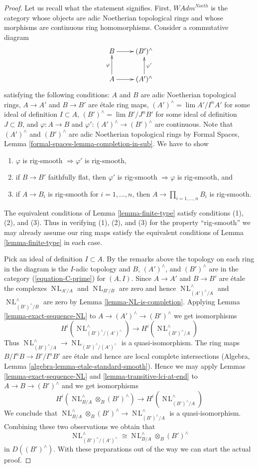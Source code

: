\documentclass[10pt,a4paper]{amsart}
\theoremstyle{plain}
\theoremstyle{definition}
\theoremstyle{remark}
\numberwithin{equation}{subsection}
\def\lim{\mathop{\mathrm{lim}}\nolimits}
\def\NL{\mathop{N\!L}\nolimits}
\begin{document}
\begin{proof}
Let us recall what the statement signifies. First, 
$\textit{WAdm}^{Noeth}$ is the category whose objects are
adic Noetherian topological rings and whose morphisms are
continuous ring homomorphisms. Consider a commutative diagram
$$
\xymatrix{
B \ar[r] & (B')^\wedge \\
A \ar[r] \ar[u]^\varphi & (A')^\wedge \ar[u]_{\varphi'}
}
$$
satisfying the following conditions:
$A$ and $B$ are adic Noetherian topological rings,
$A \to A'$ and $B \to B'$ are \'etale ring maps,
$(A')^\wedge = \lim A'/I^nA'$ for some ideal of definition $I \subset A$,
$(B')^\wedge = \lim B'/J^nB'$ for some ideal of definition $J \subset B$, and
$\varphi : A \to B$ and $\varphi' : (A')^\wedge \to (B')^\wedge$
are continuous. Note that $(A')^\wedge$ and $(B')^\wedge$ are
adic Noetherian topological rings by
Formal Spaces, Lemma \ref{formal-spaces-lemma-completion-in-sub}.
We have to show
\begin{enumerate}
\item $\varphi$ is rig-smooth $\Rightarrow \varphi'$ is rig-smooth,
\item if $B \to B'$ faithfully flat, then $\varphi'$ is rig-smooth
$\Rightarrow \varphi$ is rig-smooth, and
\item if $A \to B_i$ is rig-smooth for $i = 1, \ldots, n$, then
$A \to \prod_{i = 1, \ldots, n} B_i$ is rig-smooth.
\end{enumerate}
The equivalent conditions of Lemma \ref{lemma-finite-type} satisfy
conditions (1), (2), and (3).
Thus in verifying (1), (2), and (3) for the property
``rig-smooth'' we may already assume our ring maps satisfy
the equivalent conditions of Lemma \ref{lemma-finite-type}
in each case.

\medskip\noindent
Pick an ideal of definition $I \subset A$. By the remarks above
the topology on each ring in the diagram is the $I$-adic topology
and $B$, $(A')^\wedge$, and $(B')^\wedge$ are in the category
(\ref{equation-C-prime}) for $(A, I)$.
Since $A \to A'$ and $B \to B'$ are \'etale the complexes
$\NL_{A'/A}$ and $\NL_{B'/B}$ are zero and hence
$\NL_{(A')^\wedge/A}^\wedge$ and $\NL_{(B')^\wedge/B}^\wedge$
are zero by Lemma \ref{lemma-NL-is-completion}.
Applying Lemma \ref{lemma-exact-sequence-NL} to
$A \to (A')^\wedge \to (B')^\wedge$ we get isomorphisms
$$
H^i(\NL_{(B')^\wedge/(A')^\wedge}^\wedge) \to H^i(\NL_{(B')^\wedge/A}^\wedge)
$$
Thus $\NL_{(B')^\wedge/A}^\wedge \to \NL_{(B')^\wedge/(A')^\wedge}$
is a quasi-isomorphism. The ring maps $B/I^nB \to B'/I^nB'$ are \'etale
and hence are local complete intersections
(Algebra, Lemma \ref{algebra-lemma-etale-standard-smooth}).
Hence we may apply
Lemmas \ref{lemma-exact-sequence-NL} and
\ref{lemma-transitive-lci-at-end} to
$A \to B \to (B')^\wedge$ and we get isomorphisms
$$
H^i(\NL_{B/A}^\wedge \otimes_B (B')^\wedge) \to
H^i(\NL_{(B')^\wedge/A}^\wedge)
$$
We conclude that
$\NL_{B/A}^\wedge \otimes_B (B')^\wedge \to \NL_{(B')^\wedge/A}^\wedge$
is a quasi-isomorphism. Combining these two observations we obtain that
$$
\NL_{(B')^\wedge/(A')^\wedge}^\wedge \cong
\NL_{B/A}^\wedge \otimes_B (B')^\wedge
$$
in $D((B')^\wedge)$.
With these preparations out of the way we can start the actual proof.


\end{proof}
\end{document}
